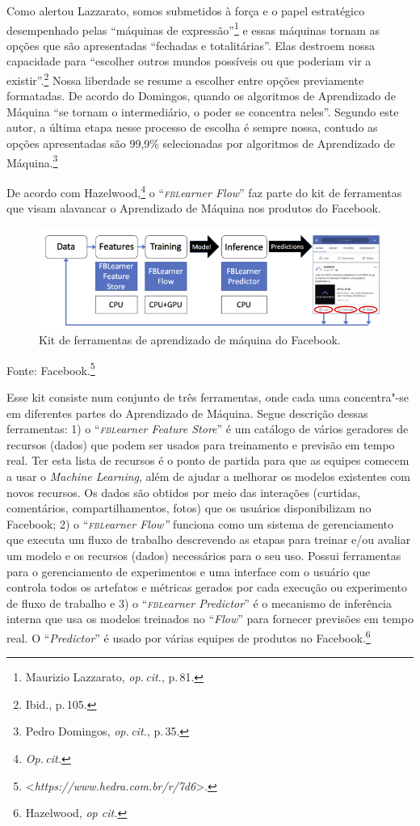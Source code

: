 Como alertou Lazzarato, somos submetidos à força e o papel
estratégico desempenhado pelas ``máquinas de expressão''\footnote{Maurizio Lazzarato, \textit{op.\,cit.}, p.\,81.} e essas
máquinas tornam as opções que são apresentadas ``fechadas e
totalitárias''. Elas destroem nossa capacidade para ``escolher outros
mundos possíveis ou que poderiam vir a existir''.\footnote{Ibid., p.\,105.} Nossa
liberdade se resume a escolher entre opções previamente formatadas. De
acordo do Domingos, quando os algoritmos de Aprendizado de
Máquina ``se tornam o intermediário, o poder se concentra neles''.
Segundo este autor, a última etapa nesse processo de escolha é sempre
nossa, contudo as opções apresentadas são 99,9\% selecionadas por
algoritmos de Aprendizado de Máquina.\footnote{Pedro Domingos, \textit{op.\,cit.}, p.\,35.}

De acordo com Hazelwood,\footnote{\textit{Op.\,cit.}} o ``\emph{\textsc{fbl}earner Flow}'' faz parte do kit de ferramentas que visam alavancar o Aprendizado de Máquina
nos produtos do Facebook.

\begin{figure}[!ht]
\includegraphics[width=\textwidth]{./imgs/grafico3.png}
\caption{\formular\footnotesize{Kit de ferramentas de aprendizado de máquina do Facebook.}}
\end{figure}

Fonte: Facebook.\footnote{\mbox{\textless{}\emph{https://www.hedra.com.br/r/7d6}\textgreater{}.}}

Esse kit consiste num conjunto de três ferramentas, onde cada uma
concentra"-se em diferentes partes do Aprendizado de Máquina. Segue
descrição dessas ferramentas: 1) o ``\emph{\textsc{fbl}earner Feature Store}'' é
um catálogo de vários geradores de recursos (dados) que podem ser usados
para treinamento e previsão em tempo real. Ter esta lista de recursos é
o ponto de partida para que as equipes comecem a usar o \emph{Machine
Learning}, além de ajudar a melhorar os modelos existentes com novos
recursos. Os dados são obtidos por meio das interações (curtidas,
comentários, compartilhamentos, fotos) que os usuários disponibilizam no
Facebook; 2) o ``\emph{\textsc{fbl}earner Flow''} funciona como um sistema de
gerenciamento que executa um fluxo de trabalho descrevendo as etapas
para treinar e/ou avaliar um modelo e os recursos (dados) necessários
para o seu uso. Possui ferramentas para o gerenciamento de experimentos
e uma interface com o usuário que controla todos os artefatos e métricas
gerados por cada execução ou experimento de fluxo de trabalho e 3) o
``\emph{\textsc{fbl}earner Predictor}'' é o mecanismo de inferência interna que
usa os modelos treinados no ``\emph{Flow}'' para fornecer previsões em
tempo real. O ``\emph{Predictor}'' é usado por várias equipes de
produtos no Facebook.\footnote{Hazelwood, \emph{op cit.}}

